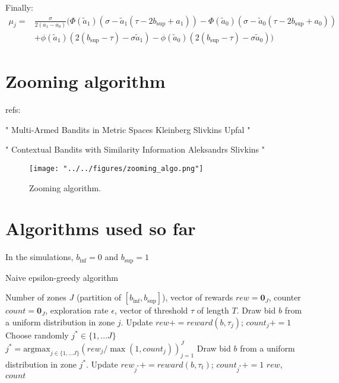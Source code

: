 \documentclass[11pt]{article}
\begin{document}
Finally:
\begin{align*}
  \mu_j = &\frac{\sigma}{2(a_1 - a_0)}\biggl( \Phi\left(\tilde{a}_1\right) \left( \sigma - \tilde{a}_1\left(\tau - 2 b_{\sup} + a_1 \right)\right) - \Phi\left(\tilde{a}_0\right) \left( \sigma - \tilde{a}_0 \left(\tau - 2 b_{\sup} + a_0 \right)\right)\\
        &+ \phi\left(\tilde{a}_1\right)\left(  2 ( b_{\sup} - \tau)-\sigma \tilde{a}_1\right) - \phi\left(\tilde{a}_0\right)\left(  2 ( b_{\sup} - \tau)- \sigma \tilde{a}_0\right)\biggr)
\end{align*}




\section{Zooming algorithm}
refs:

"
Multi-Armed Bandits in Metric Spaces
Kleinberg Slivkins Upfal
"

"
Contextual Bandits with Similarity Information
Aleksandrs Slivkins 
"

\begin{figure}[H]
  \centering
  \texttt{[image: "../../figures/zooming\_algo.png"]}
  \caption{Zooming algorithm.}
  \label{fig:zoom}
\end{figure}

\section{Algorithms used so far}

In the simulations, $b_{\inf} = 0$ and $b_{\sup} = 1$

\begin{algorithm}[H]
  \caption{Naive epsilon-greedy algorithm}
  \label{code:epsilon_greedy}
  \begin{algorithmic}[0]
  \Require Number of zones $J$ (partition of $[b_{\inf}, b_{\sup}]$), vector of rewards $rew = \mathbf{0}_J$, counter $count = \mathbf{0}_J$, exploration rate $\epsilon$,
  vector of threshold $\tau$ of length $T$.
   
  \State Draw bid $b$ from a uniform distribution in zone $j$.
  \State Update $rew += reward(b, \tau_j)$; $count_j += 1$
  \EndFor
   
  \State Choose randomly $j^* \in \{1, \dots J\}$
  \Else {}
  \State $j^* = \text{argmax}_{j \in \{1, \dots J\}} (rew_j / \max(1, count_j))_{j=1}^J$
  \EndIf
  \State Draw bid $b$ from a uniform distribution in zone $j^*$.
  \State Update $rew_{j^*} += reward(b, \tau_t)$; $count_{j^*} += 1$
  \EndFor
  \State \Return $rew$, $count$
\end{algorithmic}
\end{algorithm}
\end{document}
